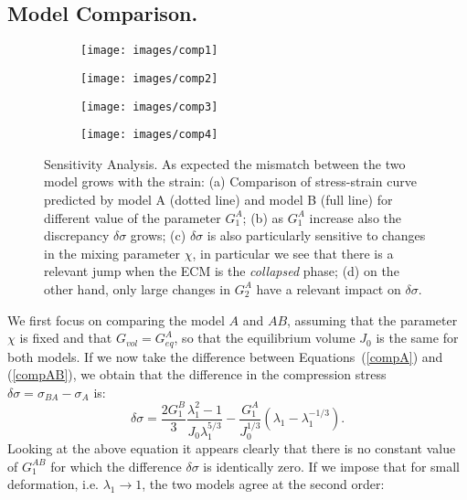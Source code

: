 \subsection{Model Comparison.}
\begin{figure}[h!]
	\begin{subfigure}{0.49\textwidth}
		\texttt{[image: images/comp1]}
		\caption{}
	\end{subfigure}
	\begin{subfigure}{0.49\textwidth}
		\texttt{[image: images/comp2]}
		\caption{}
	\end{subfigure}
	
	\begin{subfigure}{0.49\textwidth}
		\texttt{[image: images/comp3]}
		\caption{}
	\end{subfigure}
	\begin{subfigure}{0.49\textwidth}
		\texttt{[image: images/comp4]}
		\caption{}
	\end{subfigure}
	\caption{Sensitivity Analysis. As expected the mismatch between the two model grows with the strain: (a) Comparison of stress-strain curve predicted by model A (dotted line) and model B (full line) for different value of the parameter $G^A_1$; (b) as $G_1^A$ increase also the discrepancy $\delta\sigma$ grows; (c) $\delta\sigma$ is also particularly sensitive to changes in the mixing parameter $\chi$, in particular we see that there is a relevant jump when the ECM is the \textit{collapsed} phase; (d) on the other hand, only large changes in $G^A_2$ have a relevant impact on $\delta\sigma$.}
	\label{comp3}
\end{figure}
We first focus on comparing the model $A$ and $AB$, assuming that the parameter $\chi$ is fixed and that $G_{vol}=G^A_{eq}$, so that the equilibrium volume $J_0$ is the same for both models. If we now take the difference between Equations~(\ref{compA}) and (\ref{compAB}), we obtain that the difference in the compression stress $\delta \sigma= \sigma_{BA}-\sigma_{A}$ is:
\begin{equation}
\delta \sigma = \frac{2 G_1^{B}}{3} \frac{\lambda_1^2-1}{J_0\lambda_1^{5/3}} - \frac{G_1^A}{J_0^{1/3}}(\lambda_1-\lambda_1^{-1/3}).\label{err}
\end{equation}
Looking at the above equation it appears clearly that there is no constant value of $G^{AB}_1$ for which the difference $\delta \sigma$ is identically zero. If we impose that for small deformation, i.e. $\lambda_1\rightarrow 1$, the two models agree at the second order:
